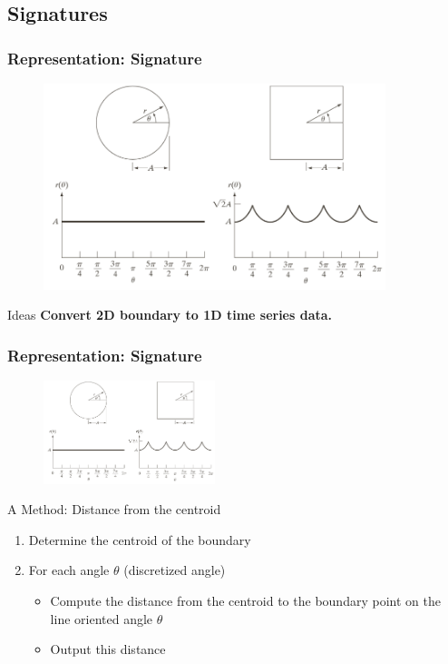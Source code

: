\documentclass[english,11pt,table,handout]{beamer}
\begin{document}
\subsection{Signatures}
\frame
{
	\frametitle{Representation: Signature}
	\begin{figure}[!h]
		\includegraphics[height=6cm]{signature.png}
	\end{figure}
	
	\begin{alertblock}{Ideas}
		\large
		\alert{\textbf{Convert 2D boundary to 1D time series data.}}
	\end{alertblock}
}
\frame
{
	\frametitle{Representation: Signature}
	\begin{figure}[!h]
		\includegraphics[height=3cm]{signature.png}
	\end{figure}
	
	\begin{block}{A Method: Distance from the centroid}
		\begin{enumerate}
			\item Determine the centroid of the boundary
			\item For each angle $\theta$ (discretized angle)
			\begin{itemize}
				\item Compute the distance from the centroid to the boundary point on the line oriented angle $\theta$ 
				\item Output this distance
			\end{itemize}
		\end{enumerate}
	\end{block}
}
\end{document}
